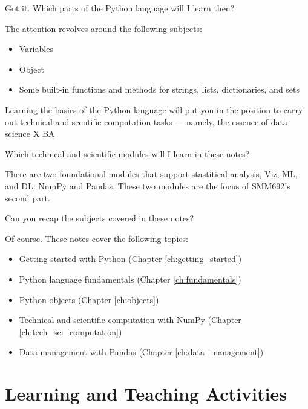 \documentclass[a4paper,11pt]{book}
\numberwithin{figure}{chapter}
\numberwithin{table}{chapter}
\newcommand{\question}[1]{%
    \begin{tcolorbox}[colback=comp_c!10,colframe=comp_c,sidebyside align=top,width=\linewidth,before skip=1ex]
        #1
    \end{tcolorbox}
    \switchcolumn%
}
\newcommand{\note}[1]{%
    \begin{tcolorbox}[colback=white!0,colframe=white!10,width=\linewidth,before skip=1ex]
        #1
    \end{tcolorbox}
}
\begin{document}
\begin{paracol}{2}
	\question{\raggedright Got it. Which parts of the Python language will I learn then?}
	\note{

	The attention revolves around the following subjects:

		\begin{itemize}
			\item Variables
			\item Object
			\item Some built-in functions and methods for strings, lists, dictionaries, and sets
		\end{itemize}
	
	Learning the basics of the Python language will put you in the position to carry out technical and scentific computation tasks --- namely, the essence of data science X BA
	}
\end{paracol}

\begin{paracol}{2}
	\question{\raggedright Which technical and scientific modules will I learn in these notes?}
	\note{There are two foundational modules that support stastitical analysis, Viz, ML, and DL: NumPy and Pandas. These two modules are the focus of SMM692's second part.
	}
\end{paracol}

\begin{paracol}{2}
	\question{\raggedright Can you recap the subjects covered in these notes?}
	\note{Of course. These notes cover the following topics:
	
	\begin{itemize}
		\item Getting started with Python (Chapter \ref{ch:getting_started})
		\item Python language fundamentals (Chapter \ref{ch:fundamentals})
		\item Python objects (Chapter \ref{ch:objects})
		\item Technical and scientific computation with NumPy (Chapter \ref{ch:tech_sci_computation})
		\item Data management with Pandas (Chapter \ref{ch:data_management})
	\end{itemize}
	}
\end{paracol}

\section{Learning and Teaching Activities}
\end{document}
